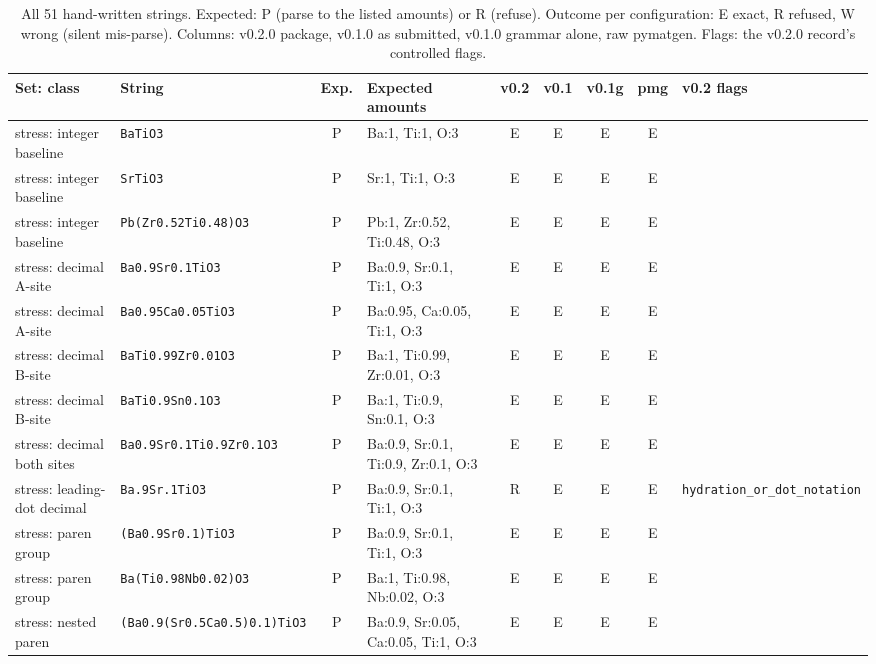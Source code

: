 \begin{longtable}{@{}>{\raggedright\arraybackslash}p{2.5cm}lcp{2.9cm}cccc>{\raggedright\arraybackslash}p{2.7cm}@{}}
\caption{All 51 hand-written strings. Expected: P (parse to the listed amounts) or R (refuse). Outcome per configuration: E exact, R refused, W wrong (silent mis-parse). Columns: v0.2.0 package, v0.1.0 as submitted, v0.1.0 grammar alone, raw pymatgen. Flags: the v0.2.0 record's controlled flags.}\label{tab:s1}\\
\toprule
Set: class & String & Exp. & Expected amounts & v0.2 & v0.1 & v0.1g & pmg & v0.2 flags \\
\midrule\endhead
stress: integer baseline & \texttt{BaTiO3} & P & Ba:1, Ti:1, O:3 & E & E & E & E & {\scriptsize\texttt{}} \\
stress: integer baseline & \texttt{SrTiO3} & P & Sr:1, Ti:1, O:3 & E & E & E & E & {\scriptsize\texttt{}} \\
stress: integer baseline & \texttt{Pb(Zr0.52Ti0.48)O3} & P & Pb:1, Zr:0.52, Ti:0.48, O:3 & E & E & E & E & {\scriptsize\texttt{}} \\
stress: decimal A-site & \texttt{Ba0.9Sr0.1TiO3} & P & Ba:0.9, Sr:0.1, Ti:1, O:3 & E & E & E & E & {\scriptsize\texttt{}} \\
stress: decimal A-site & \texttt{Ba0.95Ca0.05TiO3} & P & Ba:0.95, Ca:0.05, Ti:1, O:3 & E & E & E & E & {\scriptsize\texttt{}} \\
stress: decimal B-site & \texttt{BaTi0.99Zr0.01O3} & P & Ba:1, Ti:0.99, Zr:0.01, O:3 & E & E & E & E & {\scriptsize\texttt{}} \\
stress: decimal B-site & \texttt{BaTi0.9Sn0.1O3} & P & Ba:1, Ti:0.9, Sn:0.1, O:3 & E & E & E & E & {\scriptsize\texttt{}} \\
stress: decimal both sites & \texttt{Ba0.9Sr0.1Ti0.9Zr0.1O3} & P & Ba:0.9, Sr:0.1, Ti:0.9, Zr:0.1, O:3 & E & E & E & E & {\scriptsize\texttt{}} \\
stress: leading-dot decimal & \texttt{Ba.9Sr.1TiO3} & P & Ba:0.9, Sr:0.1, Ti:1, O:3 & R & E & E & E & {\scriptsize\texttt{hydration\_\allowbreak{}or\_\allowbreak{}dot\_\allowbreak{}notation}} \\
stress: paren group & \texttt{(Ba0.9Sr0.1)TiO3} & P & Ba:0.9, Sr:0.1, Ti:1, O:3 & E & E & E & E & {\scriptsize\texttt{}} \\
stress: paren group & \texttt{Ba(Ti0.98Nb0.02)O3} & P & Ba:1, Ti:0.98, Nb:0.02, O:3 & E & E & E & E & {\scriptsize\texttt{}} \\
stress: nested paren & \texttt{(Ba0.9(Sr0.5Ca0.5)0.1)TiO3} & P & Ba:0.9, Sr:0.05, Ca:0.05, Ti:1, O:3 & E & E & E & E & {\scriptsize\texttt{}} \\

\end{longtable}
